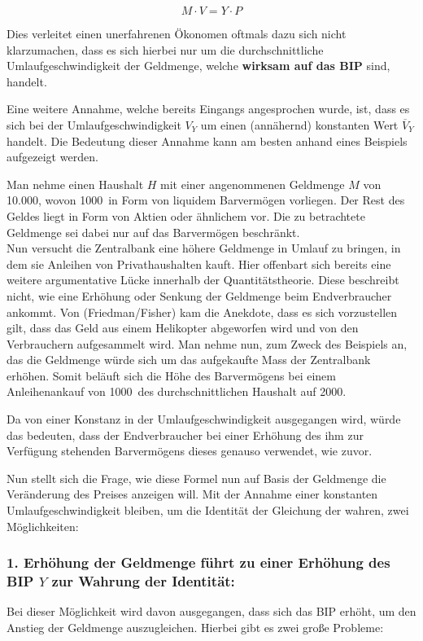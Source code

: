 $$ M \cdot V = Y \cdot P$$

Dies verleitet einen unerfahrenen Ökonomen oftmals dazu sich nicht klarzumachen, dass es sich hierbei nur um die durchschnittliche Umlaufgeschwindigkeit der Geldmenge, welche \textbf{wirksam auf das BIP} sind, handelt.

Eine weitere Annahme, welche bereits Eingangs angesprochen wurde, ist, dass es sich bei der Umlaufgeschwindigkeit $V_Y$ um einen (annähernd) konstanten Wert $\overline{V}_Y$ handelt. Die Bedeutung dieser Annahme kann am besten anhand eines Beispiels aufgezeigt werden.

\begin{example}
    Man nehme einen Haushalt $H$ mit einer angenommenen Geldmenge $M$ von 10.000\EUR, wovon 1000\EUR\ in Form von liquidem Barvermögen vorliegen. Der Rest des Geldes liegt in Form von Aktien oder ähnlichem vor. Die zu betrachtete Geldmenge sei dabei nur auf das Barvermögen beschränkt. \\
    Nun versucht die Zentralbank eine höhere Geldmenge in Umlauf zu bringen, in dem sie Anleihen von Privathaushalten kauft. Hier offenbart sich bereits eine weitere argumentative Lücke innerhalb der Quantitätstheorie. Diese beschreibt nicht, wie eine Erhöhung oder Senkung der Geldmenge beim Endverbraucher ankommt. Von (Friedman/Fisher) kam die Anekdote, dass es sich vorzustellen gilt, dass das Geld aus einem Helikopter abgeworfen wird und von den Verbrauchern aufgesammelt wird. Man nehme nun, zum Zweck des Beispiels an, das die Geldmenge würde sich um das aufgekaufte Mass der Zentralbank erhöhen. Somit beläuft sich die Höhe des Barvermögens bei einem Anleihenankauf von 1000\EUR\, des durchschnittlichen Haushalt auf 2000\EUR. 

    Da von einer Konstanz in der Umlaufgeschwindigkeit ausgegangen wird, würde das bedeuten, dass der Endverbraucher bei einer Erhöhung des ihm zur Verfügung stehenden Barvermögens dieses genauso verwendet, wie zuvor. 
\end{example}\label{Bsp.kUmlauf}

Nun stellt sich die Frage, wie diese Formel nun auf Basis der Geldmenge die Veränderung des Preises anzeigen will. Mit der Annahme einer konstanten Umlaufgeschwindigkeit bleiben, um die Identität der Gleichung der wahren, zwei Möglichkeiten:

\subsubsection*{1. Erhöhung der Geldmenge führt zu einer Erhöhung des BIP $Y$ zur Wahrung der Identität:}
Bei dieser Möglichkeit wird davon ausgegangen, dass sich das BIP erhöht, um den Anstieg der Geldmenge auszugleichen. Hierbei gibt es zwei große Probleme:

